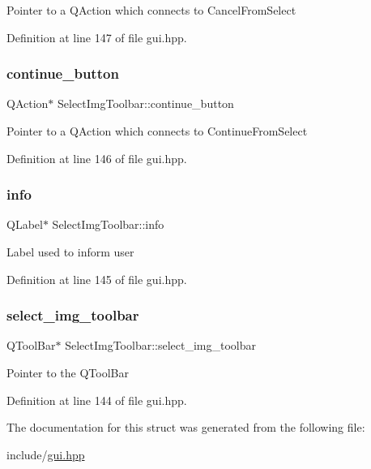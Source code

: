 Pointer to a Q\+Action which connects to Cancel\+From\+Select 

Definition at line 147 of file gui.\+hpp.

\mbox{\label{structSelectImgToolbar_a82569764f9d7e13b406a668e9e50290a}} 
\subsubsection{\texorpdfstring{continue\+\_\+button}{continue\_button}}
{\footnotesize\ttfamily Q\+Action$\ast$ Select\+Img\+Toolbar\+::continue\+\_\+button}

Pointer to a Q\+Action which connects to Continue\+From\+Select 

Definition at line 146 of file gui.\+hpp.

\mbox{\label{structSelectImgToolbar_a3cf6ac92fbe60877873c89939217e1de}} 
\subsubsection{\texorpdfstring{info}{info}}
{\footnotesize\ttfamily Q\+Label$\ast$ Select\+Img\+Toolbar\+::info}

Label used to inform user 

Definition at line 145 of file gui.\+hpp.

\mbox{\label{structSelectImgToolbar_a779bc326cf08c9fbcd1ffebb43a664eb}} 
\subsubsection{\texorpdfstring{select\+\_\+img\+\_\+toolbar}{select\_img\_toolbar}}
{\footnotesize\ttfamily Q\+Tool\+Bar$\ast$ Select\+Img\+Toolbar\+::select\+\_\+img\+\_\+toolbar}

Pointer to the Q\+Tool\+Bar 

Definition at line 144 of file gui.\+hpp.



The documentation for this struct was generated from the following file\+:\begin{DoxyCompactItemize}
\item 
include/\mbox{\hyperlink{gui_8hpp}{gui.\+hpp}}\end{DoxyCompactItemize}
